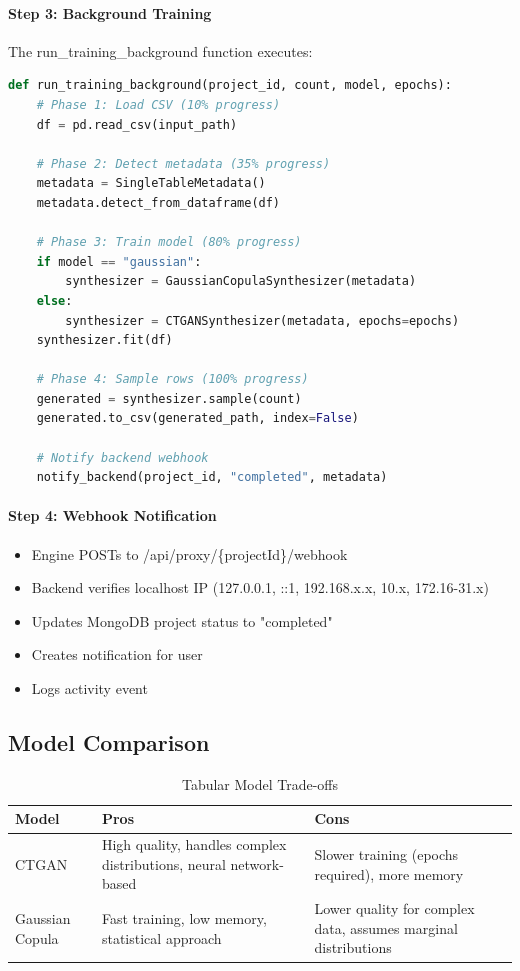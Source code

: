 \documentclass[11pt,a4paper]{article}
\begin{document}
\paragraph{Step 3: Background Training}
The run\_training\_background function executes:
\begin{lstlisting}[language=Python]
def run_training_background(project_id, count, model, epochs):
    # Phase 1: Load CSV (10% progress)
    df = pd.read_csv(input_path)
    
    # Phase 2: Detect metadata (35% progress)
    metadata = SingleTableMetadata()
    metadata.detect_from_dataframe(df)
    
    # Phase 3: Train model (80% progress)
    if model == "gaussian":
        synthesizer = GaussianCopulaSynthesizer(metadata)
    else:
        synthesizer = CTGANSynthesizer(metadata, epochs=epochs)
    synthesizer.fit(df)
    
    # Phase 4: Sample rows (100% progress)
    generated = synthesizer.sample(count)
    generated.to_csv(generated_path, index=False)
    
    # Notify backend webhook
    notify_backend(project_id, "completed", metadata)
\end{lstlisting}

\paragraph{Step 4: Webhook Notification}
\begin{itemize}[noitemsep]
    \item Engine POSTs to /api/proxy/\{projectId\}/webhook
    \item Backend verifies localhost IP (127.0.0.1, ::1, 192.168.x.x, 10.x, 172.16-31.x)
    \item Updates MongoDB project status to "completed"
    \item Creates notification for user
    \item Logs activity event
\end{itemize}

\subsection{Model Comparison}

\begin{table}[H]
\centering
\small
\begin{tabular}{lp{5cm}p{5cm}}
\toprule
\textbf{Model} & \textbf{Pros} & \textbf{Cons} \\
\midrule
CTGAN & High quality, handles complex distributions, neural network-based & Slower training (epochs required), more memory \\
Gaussian Copula & Fast training, low memory, statistical approach & Lower quality for complex data, assumes marginal distributions \\
\bottomrule
\end{tabular}
\caption{Tabular Model Trade-offs}
\end{table}
\end{document}
